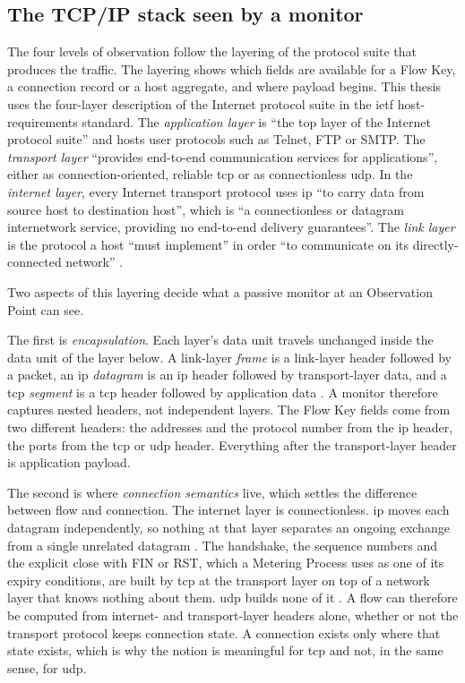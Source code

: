 \subsection{The TCP/IP stack seen by a monitor}
\label{sec:tcpip-stack-monitor-view}

The four levels of observation follow the layering of the protocol suite
that produces the traffic. The layering shows which fields are
available for a Flow Key, a connection record or a host aggregate, and where
payload begins. This thesis uses the four-layer description of the Internet
protocol suite in the \gls{ietf} host-requirements standard. The
\emph{application layer} is ``the top layer of the Internet protocol suite''
and hosts user protocols such as Telnet, FTP or SMTP. The \emph{transport
layer} ``provides end-to-end communication services for applications'',
either as connection-oriented, reliable \gls{tcp} or as connectionless
\gls{udp}. In the \emph{internet layer}, every Internet transport protocol
uses \gls{ip} ``to carry data from source host to destination host'', which
is ``a connectionless or datagram internetwork service, providing no
end-to-end delivery guarantees''. The \emph{link layer} is the protocol a
host ``must implement'' in order ``to communicate on its directly-connected
network'' \citep{braden1989rfc1122}.

Two aspects of this layering decide what a passive monitor at an
Observation Point can see.

The first is \emph{encapsulation}. Each layer's data unit travels unchanged
inside the data unit of the layer below. A link-layer \emph{frame} is a
link-layer header followed by a packet, an \gls{ip} \emph{datagram} is an
\gls{ip} header followed by transport-layer data, and a \gls{tcp}
\emph{segment} is a \gls{tcp} header followed by application data
\citep{braden1989rfc1122}. A monitor therefore captures nested headers, not
independent layers. The Flow Key fields come from two different headers: the
addresses and the protocol number from the \gls{ip} header, the ports from
the \gls{tcp} or \gls{udp} header. Everything after the transport-layer
header is application payload.

The second is where \emph{connection semantics} live, which settles the
difference between flow and connection. The internet layer is connectionless.
\gls{ip} moves each datagram independently, so nothing at that layer
separates an ongoing exchange from a single unrelated datagram
\citep{braden1989rfc1122}. The handshake, the sequence numbers and the
explicit close with FIN or RST, which a Metering Process uses as one of its
expiry conditions, are built by \gls{tcp} at the transport layer on top of a
network layer that knows nothing about them. \gls{udp} builds none of it
\citep{braden1989rfc1122}. A flow can therefore be computed from internet-
and transport-layer headers alone, whether or not the transport protocol
keeps connection state. A connection exists only where that state exists,
which is why the notion is meaningful for \gls{tcp} and not, in the same
sense, for \gls{udp}.


